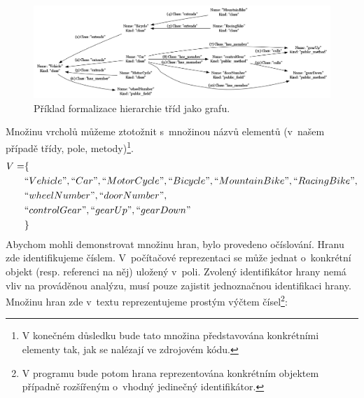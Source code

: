 \begin{figure}[h!]
  \centering
  \includegraphics[width=1.0\textwidth]{./graphs/graph_example.png}
  \caption{Příklad formalizace hierarchie tříd jako grafu.\label{design-graph_example}}
\end{figure}
Množinu vrcholů můžeme ztotožnit s~množinou názvů elementů (v~našem případě třídy, pole, metody)\footnote{V konečném důsledku bude tato množina představována konkrétními elementy tak, jak se nalézají ve zdrojovém kódu.}.
\begin{align*}
  V = &\{ \\
  &``Vehicle", ``Car", ``MotorCycle", ``Bicycle", ``MountainBike", ``RacingBike", \\
  &``wheelNumber", ``doorNumber", \\
  &``controlGear", ``gearUp", ``gearDown" \\
  &\}
\end{align*}
Abychom mohli demonstrovat množinu hran, bylo provedeno očíslování. Hranu zde identifikujeme číslem. V~počítačové reprezentaci se může jednat o~konkrétní objekt (resp. referenci na něj) uložený v~poli. Zvolený identifikátor hrany nemá vliv na prováděnou analýzu, musí pouze zajistit jednoznačnou identifikaci hrany. Množinu hran zde v~textu reprezentujeme prostým výčtem čísel\footnote{V programu bude potom hrana reprezentována konkrétním objektem případně rozšířeným o~vhodný jedinečný identifikátor.}:

